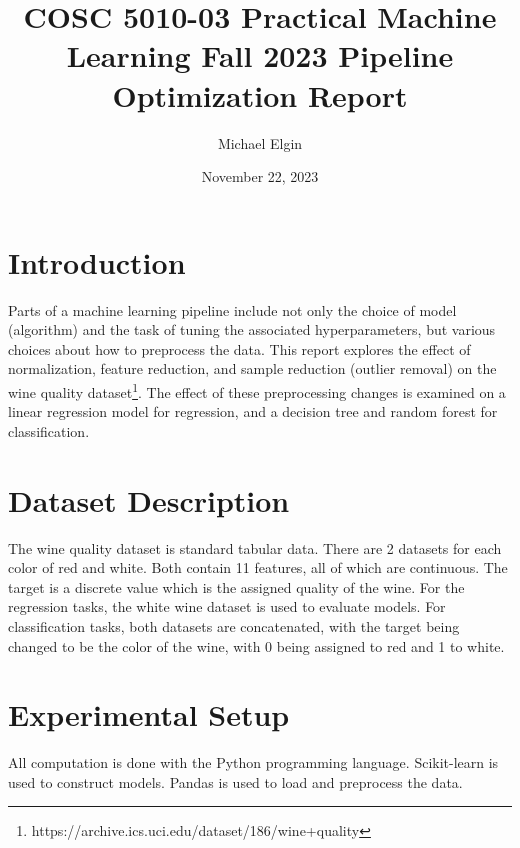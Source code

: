 \documentclass[12pt, letterpaper]{article}
\title{COSC 5010-03 Practical Machine Learning Fall 2023 Pipeline Optimization Report}
\author{Michael Elgin}
\date{November 22, 2023}
\begin{document}
\maketitle

\section{Introduction} %

Parts of a machine learning pipeline include not only the choice of model (algorithm) and the task of tuning the associated hyperparameters, but various choices about how to preprocess the data. This report explores the effect of normalization, feature reduction, and sample reduction (outlier removal) on the wine quality dataset\footnote{https://archive.ics.uci.edu/dataset/186/wine+quality}. The effect of these preprocessing changes is examined on a linear regression model for regression, and a decision tree and random forest for classification.

\section{Dataset Description} %

The wine quality dataset is standard tabular data. There are 2 datasets for each color of red and white. Both contain 11 features, all of which are continuous. The target is a discrete value which is the assigned quality of the wine. For the regression tasks, the white wine dataset is used to evaluate models. For classification tasks, both datasets are concatenated, with the target being changed to be the color of the wine, with 0 being assigned to red and 1 to white.

\section{Experimental Setup} %

All computation is done with the Python programming language. Scikit-learn is used to construct models. Pandas is used to load and preprocess the data.
\end{document}
